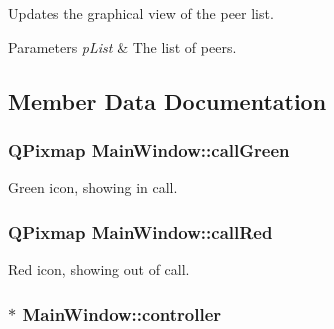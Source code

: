 \-Updates the graphical view of the peer list. 


\begin{DoxyParams}{\-Parameters}
{\em p\-List} & \-The list of peers. \\
\hline
\end{DoxyParams}


\subsection{\-Member \-Data \-Documentation}
\hypertarget{class_main_window_af6e038a052aefecc54322a166ad08bcf}{
\subsubsection[{call\-Green}]{\setlength{\rightskip}{0pt plus 5cm}\-Q\-Pixmap {\bf \-Main\-Window\-::call\-Green}}}
\label{class_main_window_af6e038a052aefecc54322a166ad08bcf}


\-Green icon, showing in call. 

\hypertarget{class_main_window_a9bd145f81a0a715e4739c3d893fb7b7b}{
\subsubsection[{call\-Red}]{\setlength{\rightskip}{0pt plus 5cm}\-Q\-Pixmap {\bf \-Main\-Window\-::call\-Red}}}
\label{class_main_window_a9bd145f81a0a715e4739c3d893fb7b7b}


\-Red icon, showing out of call. 

\hypertarget{class_main_window_a998fca79d54f491c4ef158e03e8894d4}{
\subsubsection[{controller}]{$\ast$ {\bf \-Main\-Window\-::controller}}}
\label{class_main_window_a998fca79d54f491c4ef158e03e8894d4}


